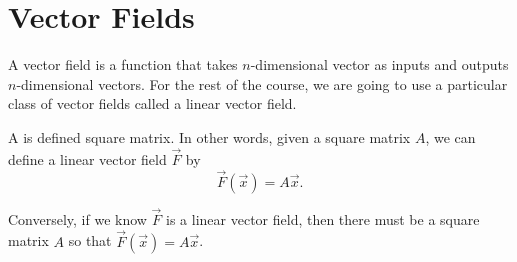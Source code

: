 \documentclass[../main.tex]{subfiles}
\begin{document}
 \section{Vector Fields}\label{sec:linalg-vector-fields}

A vector field is a function that takes \(n\)-dimensional vector as inputs and outputs \(n\)-dimensional vectors. For the rest of the course, we are going to use a particular class of vector fields called a linear vector field. 

\begin{definition}
  A  is defined square matrix.  In other words, given a square matrix \(A\), we can define a linear vector field \(\vec{F}\) by
  \[
    \vec{F}(\vec{x}) = A \vec{x}.
  \]

  Conversely, if we know \(\vec{F}\) is a linear vector field, then there must be a square matrix \(A\) so that \(\vec{F}(\vec{x}) = A \vec{x}\).
\end{definition}
\end{document}
